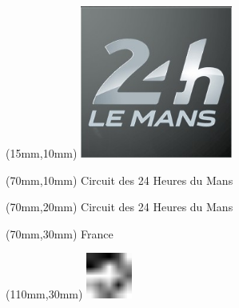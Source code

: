 \null\newpage
\begin{textblock*}{50mm}(15mm,10mm)%
\includegraphics[width=50mm]{LG/2015-05-20_00084.png}
\end{textblock*}
\begin{textblock*}{130mm}(70mm,10mm)%
{\fontsize{20}{20}\selectfont Circuit des 24 Heures du Mans}\\
\end{textblock*}
\begin{textblock*}{120mm}(70mm,20mm)%
{\fontsize{16}{16}\selectfont Circuit des 24 Heures du Mans}\\
\end{textblock*}
\begin{textblock*}{120mm}(70mm,30mm)%
{\fontsize{12}{12}\selectfont France}
\end{textblock*}
\begin{textblock*}{30mm}(110mm,30mm)%
\centering
\includegraphics[height=15mm]{icons/fa-rotate-left.pdf}
\end{textblock*}
